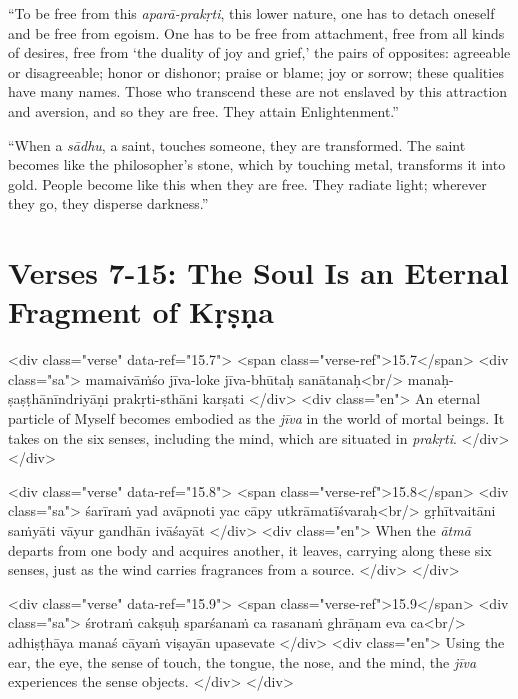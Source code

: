 \enquote{To be free from this \textit{aparā-prakṛti}, this lower nature, one has to detach oneself and be free from egoism. One has to be free from attachment, free from all kinds of desires, free from \enquote{the duality of joy and grief,} the pairs of opposites: agreeable or disagreeable; honor or dishonor; praise or blame; joy or sorrow; these qualities have many names. Those who transcend these are not enslaved by this attraction and aversion, and so they are free. They attain Enlightenment.}

\enquote{When a \textit{sādhu}, a saint, touches someone, they are transformed. The saint becomes like the philosopher’s stone, which by touching metal, transforms it into gold. People become like this when they are free. They radiate light; wherever they go, they disperse darkness.}

\section{Verses 7-15: The Soul Is an Eternal Fragment of Kṛṣṇa}\label{sec-verses-7-15-the-soul-is-an-eternal-fragment-of-krsna}


\begin{html}
<div class="verse" data-ref="15.7">
  <span class="verse-ref">15.7</span>
  <div class="sa">
    mamaivāṁśo jīva-loke jīva-bhūtaḥ sanātanaḥ<br/>
    manaḥ-ṣaṣṭhānīndriyāṇi prakṛti-sthāni karṣati
  </div>
  <div class="en">
    An eternal particle of Myself becomes embodied as the \textit{jīva} in the world of mortal beings. It takes on the six senses, including the mind, which are situated in \textit{prakṛti}.
  </div>
</div>
\end{html}



\begin{html}
<div class="verse" data-ref="15.8">
  <span class="verse-ref">15.8</span>
  <div class="sa">
    śarīraṁ yad avāpnoti yac cāpy utkrāmatīśvaraḥ<br/>
    gṛhītvaitāni saṁyāti vāyur gandhān ivāśayāt
  </div>
  <div class="en">
    When the \textit{ātmā} departs from one body and acquires another, it leaves, carrying along these six senses, just as the wind carries fragrances from a source.
  </div>
</div>
\end{html}



\begin{html}
<div class="verse" data-ref="15.9">
  <span class="verse-ref">15.9</span>
  <div class="sa">
    śrotraṁ cakṣuḥ sparśanaṁ ca rasanaṁ ghrāṇam eva ca<br/>
    adhiṣṭhāya manaś cāyaṁ viṣayān upasevate
  </div>
  <div class="en">
    Using the ear, the eye, the sense of touch, the tongue, the nose, and the mind, the \textit{jīva} experiences the sense objects.
  </div>
</div>
\end{html}



